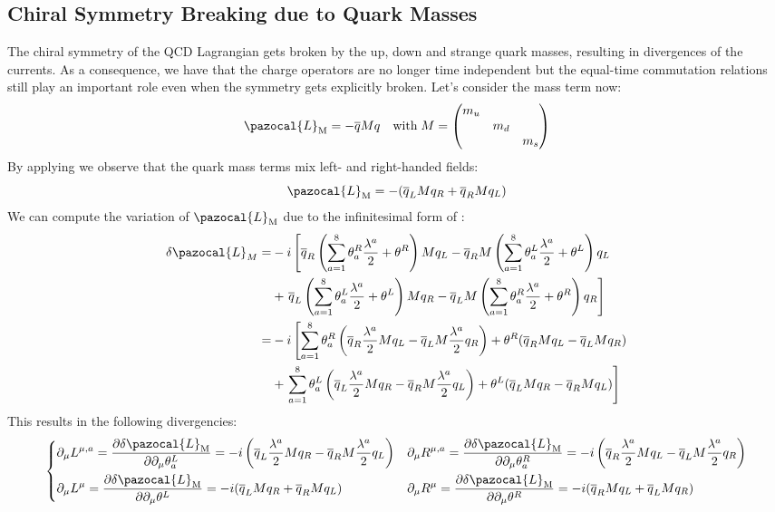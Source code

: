 \documentclass[../main.tex]{subfiles}
\begin{document}
\subsection{Chiral Symmetry Breaking due to Quark Masses}
The chiral symmetry of the QCD Lagrangian gets broken by the up, down and strange quark masses, resulting in divergences of the currents. As a consequence, we have that the charge operators are no longer time independent but the equal-time commutation relations still play an important role even when the symmetry gets explicitly broken. Let's consider the mass term now:
\[
\pazocal{L}_{\text{M}}=-\overline{q}Mq \quad \text{with}\;M=\mqty(\dmat{m_u,m_d,m_s})
\]
By applying  we observe that the quark mass terms mix left- and right-handed fields:
\[
\pazocal{L}_{\text{M}}=-(\overline{q}_LMq_R+\overline{q}_RMq_L)
\]
We can compute the variation of $\pazocal{L}_{\text{M}}$ due to the infinitesimal form of :
\begin{align*}
\delta\pazocal{L}_M=&-i\left[\overline{q}_R\left(\sum_{a=1}^8\theta_a^R\frac{\lambda^a}{2}+\theta^R\right)Mq_L-\overline{q}_RM\left(\sum_{a=1}^8\theta_a^L\frac{\lambda^a}{2}+\theta^L\right)q_L\right.\\
&+\left.\overline{q}_L\left(\sum_{a=1}^8\theta_a^L\frac{\lambda^a}{2}+\theta^L\right)Mq_R-\overline{q}_LM\left(\sum_{a=1}^8\theta_a^R\frac{\lambda^a}{2}+\theta^R\right)q_R\right]\\
=&-i\left[\sum_{a=1}^8\theta_a^R\left(\overline{q}_R\frac{\lambda^a}{2}Mq_L-\overline{q}_LM\frac{\lambda^a}{2}q_R\right)+\theta^R(\overline{q}_RMq_L-\overline{q}_LMq_R)\right.\\
&+\left.\sum_{a=1}^8\theta_a^L\left(\overline{q}_L\frac{\lambda^a}{2}Mq_R-\overline{q}_RM\frac{\lambda^a}{2}q_L\right)+\theta^L(\overline{q}_LMq_R-\overline{q}_RMq_L)\right]
\end{align*}
This results in the following divergencies:
\[
\left\{
\begin{aligned}
&\partial_\mu L^{\mu,a}=\frac{\partial\delta\pazocal{L}_{\text{M}}}{\partial\partial_\mu\theta_a^L}=-i\left(\overline{q}_L\frac{\lambda^a}{2}Mq_R-\overline{q}_RM\frac{\lambda^a}{2}q_L\right) &&\partial_\mu R^{\mu,a}=\frac{\partial\delta\pazocal{L}_{\text{M}}}{\partial\partial_\mu\theta_a^R}=-i\left(\overline{q}_R\frac{\lambda^a}{2}Mq_L-\overline{q}_LM\frac{\lambda^a}{2}q_R\right)\\
&\partial_\mu L^\mu=\frac{\partial\delta\pazocal{L}_{\text{M}}}{\partial\partial_\mu\theta^L}=-i(\overline{q}_LMq_R+\overline{q}_RMq_L) &&\partial_\mu R^\mu=\frac{\partial\delta\pazocal{L}_{\text{M}}}{\partial\partial_\mu\theta^R}=-i(\overline{q}_RMq_L+\overline{q}_LMq_R)
\end{aligned}
\right.
\]
\end{document}
